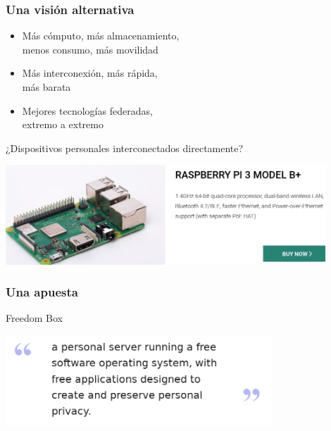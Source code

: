 \documentclass[17pt,aspectratio=169,hyperref=pdfusetitle]{beamer}
\begin{document}
\begin{frame}
\frametitle{Una visión alternativa}

\begin{itemize}
\item Más cómputo, más almacenamiento, \\
  menos consumo, más movilidad \\
\item Más interconexión, más rápida, \\
  más barata \\
\item Mejores tecnologías federadas, \\
  extremo a extremo \\
\end{itemize}

  \begin{flushright}
  ¿Dispositivos personales
  interconectados directamente? \\
  \end{flushright}

\end{frame}

\begin{frame}[fragile]

  \begin{center}
  \includegraphics[width=12cm]{figs/raspberry-pi}
  \end{center}
  
\end{frame}


\begin{frame}[fragile]
  \frametitle{Una apuesta}

  Freedom Box

  \begin{center}
  \includegraphics[width=10cm]{figs/freedom-box}
  \end{center}
  
\end{frame}
\end{document}
